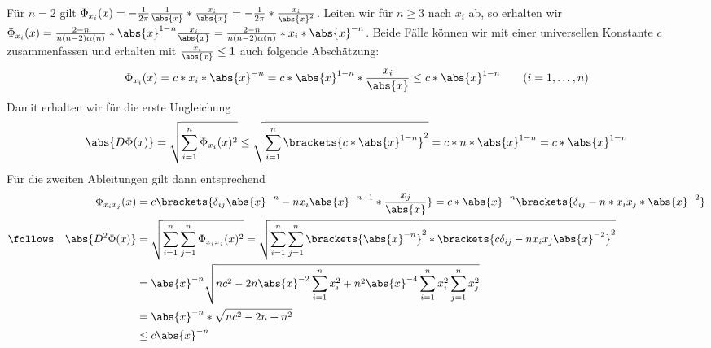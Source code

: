 \begin{exercisePage}
	Für $n=2$ gilt $\Phi_{x_i}(x) = -\frac{1}{2\pi} \frac{1}{\abs{x}} * \frac{x_i}{\abs{x}} = -\frac{1}{2\pi} * \frac{x_i}{\abs{x}^2}$. Leiten wir für $n \ge 3$ nach $x_i$ ab, so erhalten wir $\Phi_{x_i}(x) = \frac{2-n}{n(n-2) \alpha(n)} * \abs{x}^{1-n} \frac{x_i}{\abs{x}} = \frac{2-n}{n(n-2) \alpha(n)} * x_i * \abs{x}^{-n}$. Beide Fälle können wir mit einer universellen Konstante $c$ zusammenfassen und erhalten mit $\frac{x_i}{\abs{x}} \le 1$ auch folgende Abschätzung:
	\begin{equation*}
		\Phi_{x_i}(x) = c * x_i * \abs{x}^{-n} = c * \abs{x}^{1-n} * \frac{x_i}{\abs{x}} \le c * \abs{x}^{1-n} 
		\qquad (i = 1, \dots, n)
	\end{equation*}
	Damit erhalten wir für die erste Ungleichung
	\begin{equation*}
		\abs{D\Phi(x)} = \sqrt{\sum_{i=1}^n \Phi_{x_i}(x)^2} \le \sqrt{\sum_{i=1}^n \brackets{c * \abs{x}^{1-n}}^2}
		= c * n * \abs{x}^{1-n} = c * \abs{x}^{1-n}
	\end{equation*}
	Für die zweiten Ableitungen gilt dann entsprechend
	\begin{equation*}
		\begin{aligned}
			\Phi_{x_i x_j}(x) 
			&= c \brackets{\delta_{ij} \abs{x}^{-n} - n x_i \abs{x}^{-n-1} * \frac{x_j}{\abs{x}}} 
			= c * \abs{x}^{-n} \brackets{\delta_{ij} - n * x_i x_j * \abs{x}^{-2} } \\
			\follows \quad
			\abs{D^2 \Phi(x)} 
			&= \sqrt{\sum_{i=1}^n \sum_{j=1}^n \Phi_{x_i x_j}(x)^2}
			= \sqrt{\sum_{i=1}^n \sum_{j=1}^n \brackets{\abs{x}^{-n}}^2 * \brackets{c \delta_{ij} - n x_i x_j \abs{x}^{-2}}^2} \\
			&= \abs{x}^{-n} \sqrt{nc^2 - 2n \abs{x}^{-2} \sum_{i=1}^n x_i^2 + n^2 \abs{x}^{-4} \sum_{i=1}^n x_i^2 \sum_{j=1}^n x_j^2} \\
			&= \abs{x}^{-n} * \sqrt{nc^2 - 2n + n^2} \\
			&\le c \abs{x}^{-n}
		\end{aligned}
	\end{equation*}
\end{exercisePage}